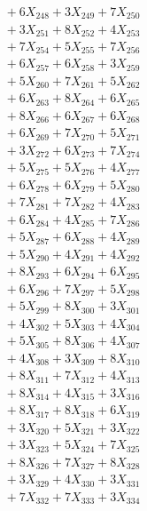 \documentclass[a4paper,10pt]{article}
\begin{document}
{\begin{align}
&\;  + 6 X_{248} + 3 X_{249} + 7 X_{250} \\[0.5ex]\allowbreak
&\;  + 3 X_{251} + 8 X_{252} + 4 X_{253} \\[0.3ex]
&\;  + 7 X_{254} + 5 X_{255} + 7 X_{256} \\[0.3ex]
&\;  + 6 X_{257} + 6 X_{258} + 3 X_{259} \\[0.3ex]
&\;  + 5 X_{260} + 7 X_{261} + 5 X_{262} \\[0.3ex]
&\;  + 6 X_{263} + 8 X_{264} + 6 X_{265} \\[0.3ex]
&\;  + 8 X_{266} + 6 X_{267} + 6 X_{268} \\[0.3ex]
&\;  + 6 X_{269} + 7 X_{270} + 5 X_{271} \\[0.3ex]
&\;  + 3 X_{272} + 6 X_{273} + 7 X_{274} \\[0.3ex]
&\;  + 5 X_{275} + 5 X_{276} + 4 X_{277} \\[0.3ex]
&\;  + 6 X_{278} + 6 X_{279} + 5 X_{280} \\[0.5ex]\allowbreak
&\;  + 7 X_{281} + 7 X_{282} + 4 X_{283} \\[0.3ex]
&\;  + 6 X_{284} + 4 X_{285} + 7 X_{286} \\[0.3ex]
&\;  + 5 X_{287} + 6 X_{288} + 4 X_{289} \\[0.3ex]
&\;  + 5 X_{290} + 4 X_{291} + 4 X_{292} \\[0.3ex]
&\;  + 8 X_{293} + 6 X_{294} + 6 X_{295} \\[0.3ex]
&\;  + 6 X_{296} + 7 X_{297} + 5 X_{298} \\[0.3ex]
&\;  + 5 X_{299} + 8 X_{300} + 3 X_{301} \\[0.3ex]
&\;  + 4 X_{302} + 5 X_{303} + 4 X_{304} \\[0.3ex]
&\;  + 5 X_{305} + 8 X_{306} + 4 X_{307} \\[0.3ex]
&\;  + 4 X_{308} + 3 X_{309} + 8 X_{310} \\[0.5ex]\allowbreak
&\;  + 8 X_{311} + 7 X_{312} + 4 X_{313} \\[0.3ex]
&\;  + 8 X_{314} + 4 X_{315} + 3 X_{316} \\[0.3ex]
&\;  + 8 X_{317} + 8 X_{318} + 6 X_{319} \\[0.3ex]
&\;  + 3 X_{320} + 5 X_{321} + 3 X_{322} \\[0.3ex]
&\;  + 3 X_{323} + 5 X_{324} + 7 X_{325} \\[0.3ex]
&\;  + 8 X_{326} + 7 X_{327} + 8 X_{328} \\[0.3ex]
&\;  + 3 X_{329} + 4 X_{330} + 3 X_{331} \\[0.3ex]
&\;  + 7 X_{332} + 7 X_{333} + 3 X_{334} \\[0.3ex]

\end{align}}
\end{document}
